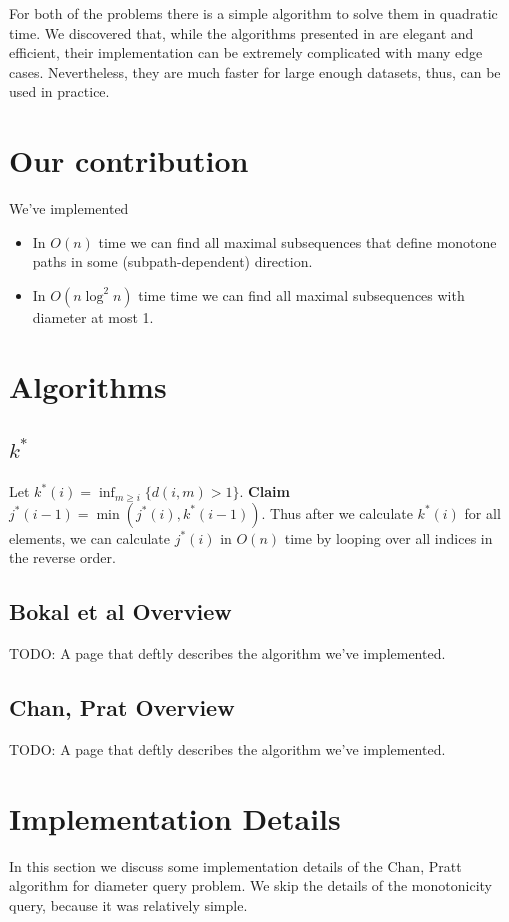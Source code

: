 \documentclass{article}
\begin{document}
For both of the problems there is a simple algorithm to solve them in quadratic time. We discovered that, while the algorithms presented in \cite{bokal_et_al:LIPIcs:2015:5113,chan_et_al:LIPIcs:2016:5920} are elegant and efficient, their implementation can be extremely complicated with many edge cases. Nevertheless, they are much faster for large enough datasets, thus, can be used in practice.

\section{Our contribution}
We've implemented
\begin{itemize}
\item In $O(n)$ time  we  can  find  all  maximal  subsequences  that  define  monotone  paths  in  some (subpath-dependent) direction. \cite{bokal_et_al:LIPIcs:2015:5113} 
\item In $O(n \log^2 n)$ time time we can find all maximal subsequences with diameter at most 1. \cite{chan_et_al:LIPIcs:2016:5920}
\end{itemize}

\section{Algorithms}
\subsection{$k^*$}

Let $k^*(i) = \inf_{m \geq i} \{d(i, m) > 1\}$. \textbf{Claim} $j^*(i-1) = \min(j^*(i), k^*(i-1))$. Thus after we calculate $k^*(i)$ for all elements, we can calculate $j^*(i)$ in $O(n)$ time by looping over all indices in the reverse order.

\subsection{Bokal et al Overview}
TODO: A page that deftly describes the algorithm we've implemented.

\subsection{Chan, Prat Overview}
TODO: A page that deftly describes the algorithm we've implemented.

\section{Implementation Details}
In this section we discuss some implementation details of the Chan, Pratt algorithm for diameter query problem. We skip the details of the monotonicity query, because it was relatively simple.
\end{document}
